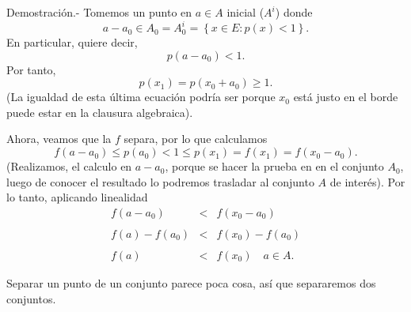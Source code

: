 \begin{paracol}{2}
\begin{teo}
	Demostración.-\; Tomemos un punto en $a\in A$ inicial ($A^i$) donde
	$$a-a_0\in A_0=A_0^i=\left\{x\in E:p(x)<1 \right\}.$$
	En particular, quiere decir, 
	$$p(a-a_0)<1.$$
	Por tanto, 
	$$p(x_1)=p(x_0+a_0)\geq 1.$$ 
	(La igualdad de esta última ecuación podría ser porque $x_0$ está justo en el borde puede estar en la clausura algebraica).

	Ahora, veamos que la $f$ separa, por lo que calculamos 
	$$f(a-a_0)\leq p(a_0) < 1 \leq p(x_1)=f(x_1)=f(x_0-a_0).$$
	(Realizamos, el calculo en $a-a_0$, porque se hacer la prueba en en el conjunto $A_0$, luego de conocer el resultado lo podremos trasladar al conjunto $A$ de interés). Por lo tanto, aplicando linealidad 
	$$
	\begin{array}{rcl}
	    f(a-a_0)&<&f(x_0-a_0)\\\\
	    f(a)-f(a_0) &<& f(x_0)-f(a_0)\\\\
	    f(a) &<& f(x_0) \quad a\in A.
	\end{array}
	$$
\end{teo}

\begin{tcolorbox}[colframe=white]
    Separar un punto de un conjunto parece poca cosa, así que separaremos dos conjuntos.
\end{tcolorbox}


\end{paracol}
